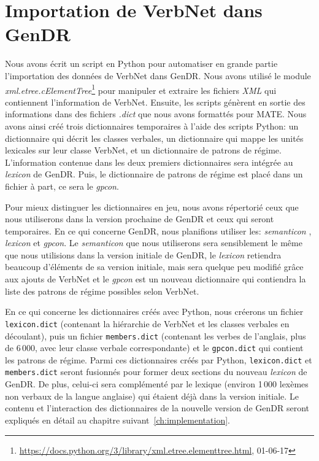 
\chapter{Importation de VerbNet dans GenDR}\label{ch:python}

Nous avons écrit un script en Python pour automatiser en grande partie l'importation des données de VerbNet dans GenDR. Nous avons utilisé le module \emph{xml.etree.cElementTree}\footnote{\url{https://docs.python.org/3/library/xml.etree.elementtree.html}, 01-06-17} pour manipuler et extraire les fichiers \emph{XML} qui contiennent l'information de VerbNet. Ensuite, les scripts génèrent en sortie des informations dans des fichiers \emph{.dict} que nous avons formattés pour MATE. Nous avons ainsi créé trois dictionnaires temporaires à l'aide des scripts Python: un dictionnaire qui décrit les classes verbales, un dictionnaire qui mappe les unités lexicales sur leur classe VerbNet, et un dictionnaire de patrons de régime. L'information contenue dans les deux premiers dictionnaires sera intégrée au \emph{lexicon} de GenDR. Puis, le dictionnaire de patrons de régime est placé dans un fichier à part, ce sera le \emph{gpcon}.

Pour mieux distinguer les dictionnaires en jeu, nous avons répertorié ceux que nous utiliserons dans la version prochaine de GenDR et ceux qui seront temporaires. En ce qui concerne GenDR, nous planifions utiliser les: \emph{semanticon} , \emph{lexicon} et \emph{gpcon}. Le \emph{semanticon} que nous utiliserons sera sensiblement le même que nous utilisions dans la version initiale de GenDR, le \emph{lexicon} retiendra beaucoup d'éléments de sa version initiale, mais sera quelque peu modifié grâce aux ajouts de VerbNet et le \emph{gpcon} est un nouveau dictionnaire qui contiendra la liste des patrons de régime possibles selon VerbNet.

En ce qui concerne les dictionnaires créés avec Python, nous créerons un fichier \lstinline|lexicon.dict| (contenant la hiérarchie de VerbNet et les classes verbales en découlant), puis un fichier \lstinline|members.dict| (contenant les verbes de l'anglais, plus de 6\,000, avec leur classe verbale correspondante) et le \lstinline|gpcon.dict| qui contient les patrons de régime. Parmi ces dictionnaires créés par Python, \lstinline|lexicon.dict| et \lstinline|members.dict| seront fusionnés pour former deux sections du nouveau \emph{lexicon} de GenDR. De plus, celui-ci sera complémenté par le lexique (environ 1\,000 lexèmes non verbaux de la langue anglaise) qui étaient  déjà dans la version initiale. Le contenu et l'interaction des dictionnaires de la nouvelle version de GenDR seront expliqués en détail au chapitre suivant~\ref{ch:implementation}.
 
